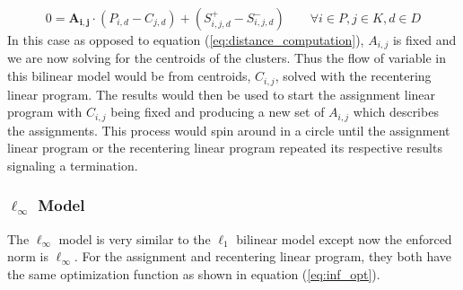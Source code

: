 \documentclass[a4paper,12pt]{article}
\numberwithin{equation}{section}
\begin{document}
\begin{equation}
0=\boldsymbol{A_{i,j}}\cdot(P_{i,d}-C_{j,d})+(S^{+}_{i,j,d}-S^{-}_{i,j,d}) \qquad \forall i \in P, j\in K, d \in D 
\label{eq:flex_centers}
\end{equation}
In this case as opposed to equation (\ref{eq:distance_computation}), $A_{i,j}$ is fixed and we are now solving for the centroids of the clusters. Thus the flow of variable in this bilinear model would be from centroids, $C_{i,j}$, solved with the recentering linear program. The results would then be used to start the assignment linear program with $C_{i,j}$ being fixed and producing a new set of $A_{i,j}$ which describes the assignments. This process would spin around in a circle until the assignment linear program or the recentering linear program repeated its respective results signaling a termination. 
 
\subsubsection{$\ell_\infty$ Model}
The $\ell_\infty$ model is very similar to the $\ell_1$ bilinear model except now the enforced norm is $\ell_\infty$.  For the assignment and recentering linear program, they both have the same optimization function as shown in equation (\ref{eq:inf_opt}).
\end{document}
